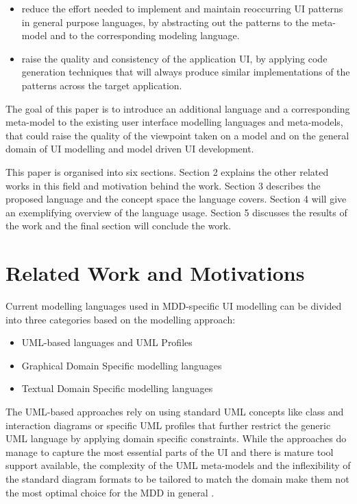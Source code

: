 \documentclass[conference]{IEEEtran}
\begin{document}
\begin{itemize}
  \item reduce the effort needed to implement and maintain reoccurring UI
    patterns in general purpose languages, by abstracting out the patterns to
    the meta-model and to the corresponding modeling language.
  \item raise the quality and consistency of the application UI, by applying
    code generation techniques that will always produce similar implementations
    of the patterns across the target application.
\end{itemize}

The goal of this paper is to introduce an additional language and a
corresponding meta-model to the existing user interface modelling languages and
meta-models, that could raise the quality of the viewpoint taken on a model and
on the general domain of UI modelling and model driven UI development.

This paper is organised into six sections.  Section 2 explains the other
related works in this field and motivation behind the work.  Section 3
describes the proposed language and the concept space the language covers.
Section 4 will give an exemplifying overview of the language usage.  Section 5
discusses the results of the work and the final section will conclude the work.

\section{Related Work and Motivations}

Current modelling languages used in MDD-specific UI modelling can be divided
into three categories based on the modelling approach:

\begin{itemize}
  \item UML-based languages and UML Profiles
  \item Graphical Domain Specific modelling languages
  \item Textual Domain Specific modelling languages
\end{itemize}

The UML-based approaches rely on using standard UML concepts like class and
interaction diagrams \cite{Silva00userinterface} or specific UML profiles
\cite{KochKraus02expressivepower} that further restrict the generic UML
language by applying domain specific constraints. While the approaches do
manage to capture the most essential parts of the UI and there is mature tool
support available, the complexity of the UML meta-models and the inflexibility
of the standard diagram formats to be tailored to match the domain make them
not the most optimal choice for the MDD in general
\cite{KellyTolvanen08DomainSpecific}.
\end{document}
